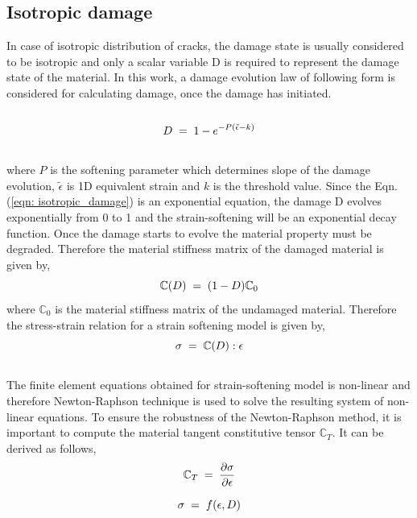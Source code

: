 \documentclass[a4paper,12pt,twoside]{report}
\begin{document}
\subsection{Isotropic damage}
\indent\indent\indent In case of isotropic distribution of cracks, the damage state is usually considered to be isotropic and only a scalar variable D is required to represent the damage state of the material. In this work, a damage evolution law of following form is considered for calculating damage, once the damage has initiated.\\
\\
\begin{equation}
  \large{ D \; = \; 1 - e^{-P(\tilde{\epsilon} - k)}}
  \label{eqn: isotropic_damage}
\end{equation} 
\\
where $P$ is the softening parameter which determines slope of the damage evolution, $\tilde{\epsilon}$ is 1D equivalent strain  and $k$ is the threshold value. Since the Eqn.(\ref{eqn: isotropic_damage}) is an exponential equation, the damage D evolves exponentially from 0 to 1 and the strain-softening will be an exponential decay function. Once the damage starts to evolve the material property must be degraded. Therefore the material stiffness matrix of the  damaged material is given by,\\
\begin{equation}
\large{\mathbb{C}(D) \; = \; (1  - D) \mathbb{C}_{0} }
\end{equation} 
where $\mathbb{C}_{0}$ is the material stiffness matrix of the undamaged material. Therefore the stress-strain relation for a strain softening model is given by,\\
\begin{equation}
\large{\sigma \; = \; \mathbb{C}(D) : \epsilon }  
\end{equation}
\\
The finite element equations obtained for strain-softening model is non-linear and therefore Newton-Raphson technique is used to solve the resulting system of non-linear equations. To ensure the robustness of the Newton-Raphson method, it is important to compute the material tangent constitutive tensor $\mathbb{C}_{T}$. It can be derived as follows,\\
\begin{equation*}
\large{ \mathbb{C}_{T}  \; = \;\frac{\partial \sigma}{\partial \epsilon}  }
\end{equation*}

\begin{equation*}
\large{\sigma  \; = \; f(\epsilon, D) }
\end{equation*}
\end{document}
